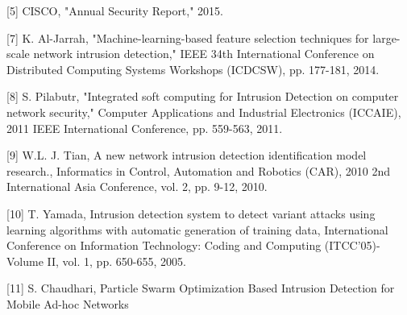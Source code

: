 \documentclass{article}
\begin{document}
[5] CISCO, "Annual Security Report," 2015.



[7] K. Al-Jarrah, "Machine-learning-based feature selection techniques for large-scale network intrusion detection," IEEE 34th International Conference on Distributed Computing Systems Workshops (ICDCSW), pp. 177-181, 2014. 

[8] S. Pilabutr, "Integrated soft computing for Intrusion Detection on computer network security," Computer Applications and Industrial Electronics (ICCAIE), 2011 IEEE International Conference, pp. 559-563, 2011. 

[9] W.L. J. Tian, A new network intrusion detection identification model research., Informatics in Control, Automation and Robotics (CAR), 2010 2nd International Asia Conference, vol. 2, pp. 9-12, 2010. 

[10] T. Yamada, Intrusion detection system to detect variant attacks using learning algorithms with automatic generation of training data, International Conference on Information Technology: Coding and Computing (ITCC'05)-Volume II, vol. 1, pp. 650-655, 2005. 

[11] S. Chaudhari, Particle Swarm Optimization Based Intrusion Detection for Mobile Ad-hoc Networks
\end{document}
